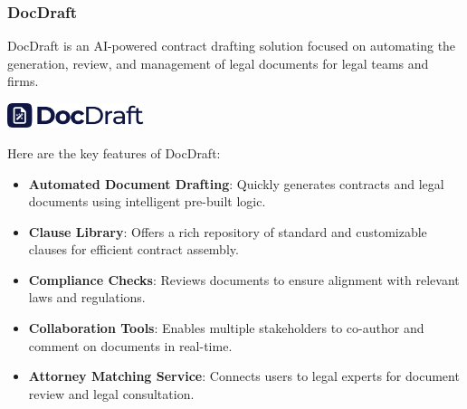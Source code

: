 \subsubsection{DocDraft}
DocDraft is an AI-powered contract drafting solution focused on automating the generation, review, and management of legal documents for legal teams and firms.\mynewline

\begin{center}
    \centering
    \includegraphics[width=0.3\textwidth]{Images/docdraft_logo.png}
     \cite{docdraft}
    \label{fig:docdraft}
\end{center}

Here are the key features of DocDraft:
\begin{itemize}
    \item \textbf{Automated Document Drafting}: Quickly generates contracts and legal documents using intelligent pre-built logic.
    \item \textbf{Clause Library}: Offers a rich repository of standard and customizable clauses for efficient contract assembly.
    \item \textbf{Compliance Checks}: Reviews documents to ensure alignment with relevant laws and regulations.
    \item \textbf{Collaboration Tools}: Enables multiple stakeholders to co-author and comment on documents in real-time.
    \item \textbf{Attorney Matching Service}: Connects users to legal experts for document review and legal consultation.
\end{itemize}

